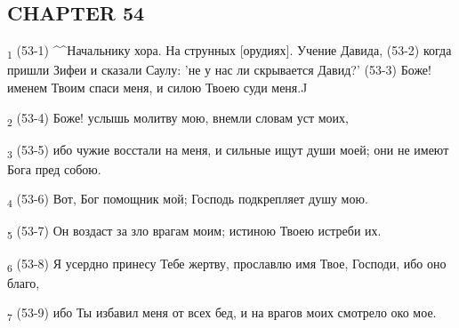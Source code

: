 \subsection{CHAPTER 54}
\begin{tcolorbox}
\textsubscript{1} (53-1) ^^Начальнику хора. На струнных [орудиях]. Учение Давида, (53-2) когда пришли Зифеи и сказали Саулу: 'не у нас ли скрывается Давид?' (53-3) Боже! именем Твоим спаси меня, и силою Твоею суди меня.^^
\end{tcolorbox}
\begin{tcolorbox}
\textsubscript{2} (53-4) Боже! услышь молитву мою, внемли словам уст моих,
\end{tcolorbox}
\begin{tcolorbox}
\textsubscript{3} (53-5) ибо чужие восстали на меня, и сильные ищут души моей; они не имеют Бога пред собою.
\end{tcolorbox}
\begin{tcolorbox}
\textsubscript{4} (53-6) Вот, Бог помощник мой; Господь подкрепляет душу мою.
\end{tcolorbox}
\begin{tcolorbox}
\textsubscript{5} (53-7) Он воздаст за зло врагам моим; истиною Твоею истреби их.
\end{tcolorbox}
\begin{tcolorbox}
\textsubscript{6} (53-8) Я усердно принесу Тебе жертву, прославлю имя Твое, Господи, ибо оно благо,
\end{tcolorbox}
\begin{tcolorbox}
\textsubscript{7} (53-9) ибо Ты избавил меня от всех бед, и на врагов моих смотрело око мое.
\end{tcolorbox}
